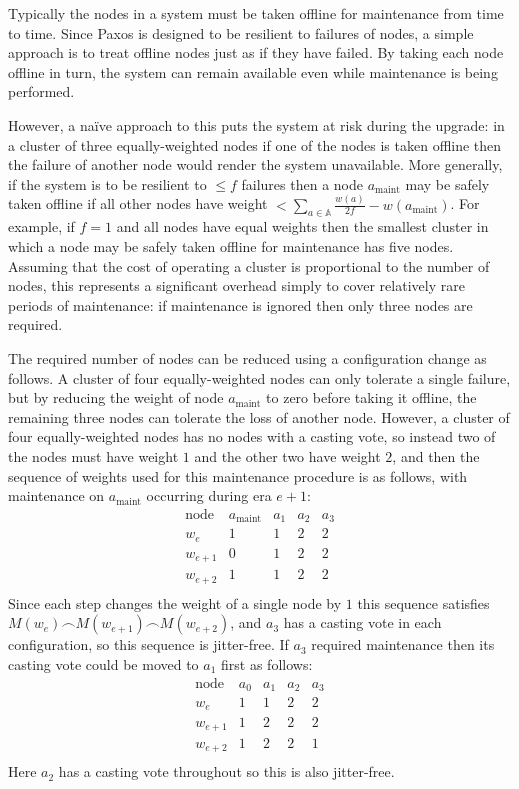 \documentclass[journal]{IEEEtran}
\begin{document}
Typically the nodes in a system must be taken offline for maintenance from time
to time. Since Paxos is designed to be resilient to failures of nodes, a simple
approach is to treat offline nodes just as if they have failed. By taking each
node offline in turn, the system can remain available even while maintenance is
being performed.

However, a na\"ive approach to this puts the system at risk during the upgrade:
in a cluster of three equally-weighted nodes if one of the nodes is taken
offline then the failure of another node would render the system unavailable.
More generally, if the system is to be resilient to $\le f$ failures then a
node $a_{\textrm{maint}}$ may be safely taken offline if all other nodes have
weight $< \sum_{a \in \mathbb A} \frac{w(a)}{2f} - w(a_{\textrm{maint}})$. For
example, if $f = 1$ and all nodes have equal weights then the smallest cluster
in which a node may be safely taken offline for maintenance has five nodes.
Assuming that the cost of operating a cluster is proportional to the number of
nodes, this represents a significant overhead simply to cover relatively rare
periods of maintenance: if maintenance is ignored then only three nodes are
required.

The required number of nodes can be reduced using a configuration change as
follows. A cluster of four equally-weighted nodes can only tolerate a single
failure, but by reducing the weight of node $a_{\textrm{maint}}$ to zero before
taking it offline, the remaining three nodes can tolerate the loss of another
node. However, a cluster of four equally-weighted nodes has no nodes with a
casting vote, so instead two of the nodes must have weight $1$ and the other
two have weight $2$, and then the sequence of weights used for this maintenance
procedure is as follows, with maintenance on $a_{\textrm{maint}}$ occurring
during era ${e+1}$:
\[\begin{array}{rcccc}
\textrm{node}&a_{\textrm{maint}}&a_1&a_2&a_3 \\
w_e&1&1&2&2\\
w_{e+1}&0&1&2&2\\
w_{e+2}&1&1&2&2\\
\end{array}\]
Since each step changes the weight of a single node by $1$ this sequence
satisfies $M(w_e) \frown M(w_{e+1}) \frown M(w_{e+2})$, and $a_3$ has a casting
vote in each configuration, so this sequence is jitter-free.  If $a_3$ required
maintenance then its casting vote could be moved to $a_1$ first as follows:
\[\begin{array}{rcccc}
\textrm{node}&a_0&a_1&a_2&a_3 \\
w_e&1&1&2&2\\
w_{e+1}&1&2&2&2\\
w_{e+2}&1&2&2&1\\
\end{array}\]
Here $a_2$ has a casting vote throughout so this is also jitter-free.
\end{document}
